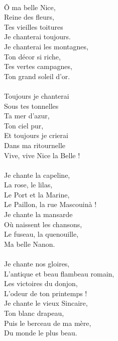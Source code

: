 {\\Ô ma belle Nice,
\\Reine des fleurs,
\\Tes vieilles toitures
\\Je chanterai toujours.
\\Je chanterai les montagnes,
\\Ton décor si riche,
\\Tes vertes campagnes,
\\Ton grand soleil d’or.
\\\\Toujours je chanterai
\\Sous tes tonnelles
\\Ta mer d’azur,
\\Ton ciel pur,
\\Et toujours je crierai
\\Dans ma ritournelle
\\Vive, vive Nice la Belle !
\\\\Je chante la capeline,
\\La rose, le lilas,
\\Le Port et la Marine,
\\Le Paillon, la rue Mascouinà !
\\Je chante la mansarde
\\Où naissent les chansons,
\\Le fuseau, la quenouille,
\\Ma belle Nanon.
\\\\Je chante nos gloires,
\\L’antique et beau flambeau romain,
\\Les victoires du donjon,
\\L’odeur de ton printemps !
\\Je chante le vieux Sincaire,
\\Ton blanc drapeau,
\\Puis le berceau de ma mère,
\\Du monde le plus beau.
}
\breakpage